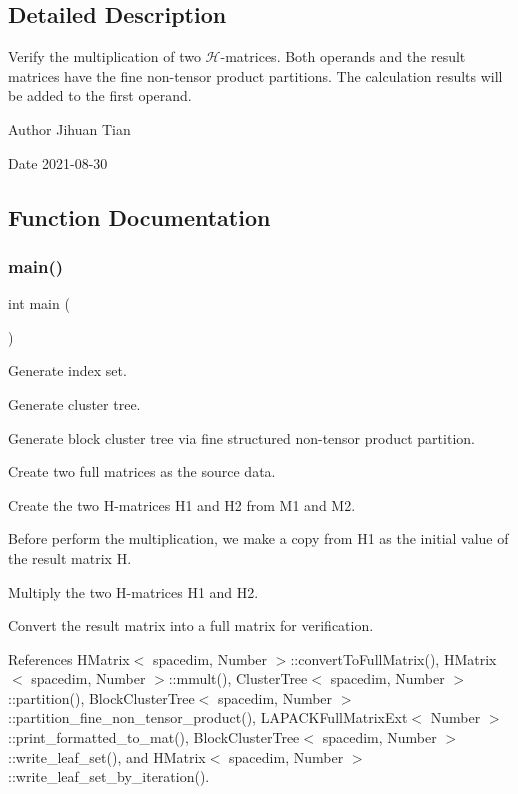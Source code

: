 \subsection{Detailed Description}
Verify the multiplication of two $\mathcal{H}$-\/matrices. Both operands and the result matrices have the fine non-\/tensor product partitions. The calculation results will be added to the first operand. 

\begin{DoxyAuthor}{Author}
Jihuan Tian 
\end{DoxyAuthor}
\begin{DoxyDate}{Date}
2021-\/08-\/30 
\end{DoxyDate}


\subsection{Function Documentation}
\mbox{\label{hmatrix-hmatrix-mmult-all-fine-ntp-with-adding_8cc_ae66f6b31b5ad750f1fe042a706a4e3d4}} 
\subsubsection{\texorpdfstring{main()}{main()}}
{\footnotesize\ttfamily int main (\begin{DoxyParamCaption}{ }\end{DoxyParamCaption})}

Generate index set.

Generate cluster tree.

Generate block cluster tree via fine structured non-\/tensor product partition.

Create two full matrices as the source data.

Create the two H-\/matrices {\ttfamily H1} and {\ttfamily H2} from {\ttfamily M1} and {\ttfamily M2}.

Before perform the multiplication, we make a copy from {\ttfamily H1} as the initial value of the result matrix {\ttfamily H}.

Multiply the two H-\/matrices {\ttfamily H1} and {\ttfamily H2}.

Convert the result matrix into a full matrix for verification.

References H\+Matrix$<$ spacedim, Number $>$\+::convert\+To\+Full\+Matrix(), H\+Matrix$<$ spacedim, Number $>$\+::mmult(), Cluster\+Tree$<$ spacedim, Number $>$\+::partition(), Block\+Cluster\+Tree$<$ spacedim, Number $>$\+::partition\+\_\+fine\+\_\+non\+\_\+tensor\+\_\+product(), L\+A\+P\+A\+C\+K\+Full\+Matrix\+Ext$<$ Number $>$\+::print\+\_\+formatted\+\_\+to\+\_\+mat(), Block\+Cluster\+Tree$<$ spacedim, Number $>$\+::write\+\_\+leaf\+\_\+set(), and H\+Matrix$<$ spacedim, Number $>$\+::write\+\_\+leaf\+\_\+set\+\_\+by\+\_\+iteration().


